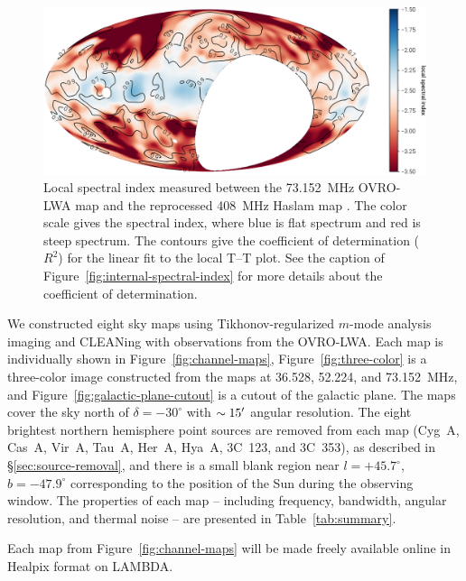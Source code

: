 \begin{bibunit}
\begin{figure}[t]
    \centering
    \includegraphics[width=\textwidth]{figures/chapter3/better-haslam-spectral-index}
    \caption{
        Local spectral index measured between the 73.152~MHz OVRO-LWA map and the reprocessed
        408~MHz Haslam map \citep{2015MNRAS.451.4311R}.  The color scale gives the spectral index,
        where blue is flat spectrum and red is steep spectrum. The contours give the coefficient of
        determination ($R^2$) for the linear fit to the local T--T plot. See the caption of
        Figure~\ref{fig:internal-spectral-index} for more details about the coefficient of
        determination.
    }
    \label{fig:haslam-spectral-index}
\end{figure}

We constructed eight sky maps using Tikhonov-regularized $m$-mode analysis imaging and CLEANing with
observations from the OVRO-LWA. Each map is individually shown in Figure~\ref{fig:channel-maps},
Figure~\ref{fig:three-color} is a three-color image constructed from the maps at 36.528,
52.224, and 73.152~MHz, and Figure~\ref{fig:galactic-plane-cutout} is a cutout of the galactic
plane. The maps cover the sky north of $\delta=-30^\circ$ with $\sim 15\mbox{$^\prime$}$ angular resolution.
The eight brightest northern hemisphere point sources are removed from each map (Cyg~A, Cas~A,
Vir~A, Tau~A, Her~A, Hya~A, 3C~123, and 3C~353), as described in \S\ref{sec:source-removal}, and
there is a small blank region near $l=+45.7^\circ$, $b=-47.9^\circ$ corresponding to the position of
the Sun during the observing window. The properties of each map -- including frequency, bandwidth,
angular resolution, and thermal noise -- are presented in Table~\ref{tab:summary}.

Each map from Figure~\ref{fig:channel-maps} will be made freely available online in Healpix format
\citep{2005ApJ...622..759G} on LAMBDA.


\end{bibunit}
